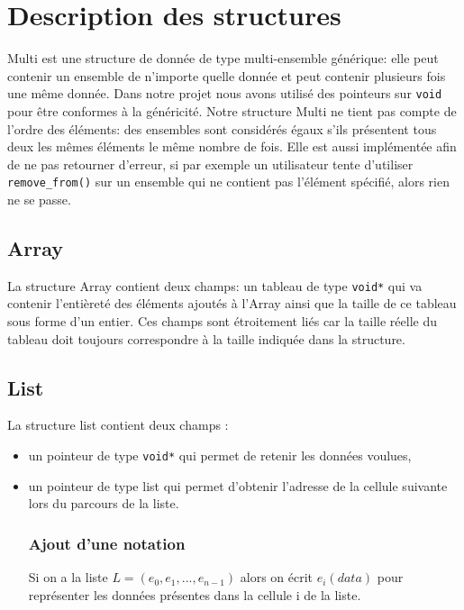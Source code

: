 \documentclass[a4paper, 11pt, oneside]{article}
\begin{document}
	\clearpage
\section{Description des structures}
	Multi est une structure de donnée de type multi-ensemble générique: elle peut contenir un ensemble de n'importe quelle donnée et peut contenir plusieurs fois une même donnée. Dans notre projet nous avons utilisé des pointeurs sur \texttt{void} pour être conformes à la généricité. Notre structure Multi ne tient pas compte de l'ordre des éléments: des ensembles sont considérés égaux s'ils présentent tous deux les mêmes éléments le même nombre de fois. Elle est aussi implémentée afin de ne pas retourner d'erreur, si par exemple un utilisateur tente d'utiliser \texttt{remove\_from()} sur un ensemble qui ne contient pas l'élément spécifié, alors rien ne se passe.
	\subsection{Array}
		La structure Array contient deux champs: un tableau de type \texttt{void*} qui va contenir l'entièreté des éléments ajoutés à l'Array ainsi que la taille de ce tableau sous forme d'un entier. Ces champs sont étroitement liés car la taille réelle du tableau doit toujours correspondre à la taille indiquée dans la structure.
	\subsection{List}
		La structure list contient deux champs :
		\begin{itemize}
			\item un pointeur de type \texttt{void*} qui permet de retenir les données voulues,
			\item un pointeur de type list qui permet d'obtenir l'adresse de la cellule suivante lors du parcours de la liste. 
	\subsubsection{Ajout d'une notation}
	Si on a la liste $L = (e_0, e_1,..., e_{n-1})$ alors on écrit $e_i(data)$ pour représenter les données présentes dans la cellule i de la liste. 
		\end{itemize}

	
\end{document}
